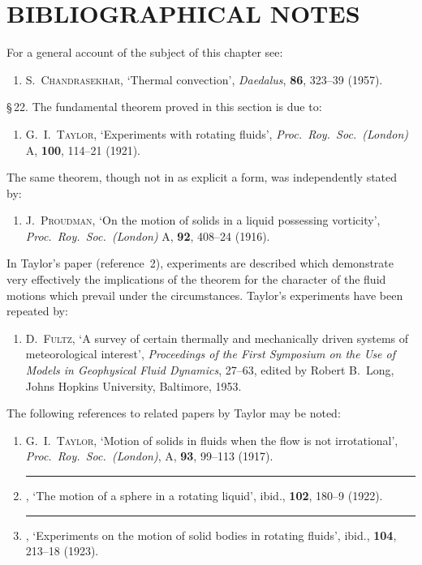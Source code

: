 \section*{BIBLIOGRAPHICAL NOTES}

For a general account of the subject of this chapter see:

\begin{enumerate}
\item[1.] S.\ \textsc{Chandrasekhar}, `Thermal convection', \emph{Daedalus}, \textbf{86}, 323--39 (1957).
\end{enumerate}

\noindent \S\,22.  The fundamental theorem proved in this section is due to:
\begin{enumerate}
\item[2.] G.\ I.\ \textsc{Taylor}, `Experiments with rotating fluids', \emph{Proc.\ Roy.\ Soc.\ (London)}
  A, \textbf{100}, 114--21 (1921).
\end{enumerate}

\noindent The same theorem, though not in as explicit a form, was independently stated by:
\begin{enumerate}
\item[3.] J.\ \textsc{Proudman}, `On the motion of solids in a liquid possessing vorticity',
  \emph{Proc.\ Roy.\ Soc.\ (London)} A, \textbf{92}, 408--24 (1916).
\end{enumerate}

In Taylor's paper (reference~2), experiments are described which demonstrate
very effectively the implications of the theorem for the character of the fluid
motions which prevail under the circumstances.  Taylor's experiments have been
repeated by:
\begin{enumerate}
\item[4.] D.\ \textsc{Fultz}, `A survey of certain thermally and mechanically driven systems
  of meteorological interest', \emph{Proceedings of the First Symposium on the Use
  of Models in Geophysical Fluid Dynamics}, 27--63, edited by Robert B.\ Long,
  Johns Hopkins University, Baltimore, 1953.
\end{enumerate}

\noindent The following references to related papers by Taylor may be noted:
\begin{enumerate}
\item[5.] G.\ I.\ \textsc{Taylor}, `Motion of solids in fluids when the flow is not irrotational',
  \emph{Proc.\ Roy.\ Soc.\ (London)}, A, \textbf{93}, 99--113 (1917).
\item[6.] \rule{2em}{0.4pt}, `The motion of a sphere in a rotating liquid', ibid., \textbf{102}, 180--9
  (1922).
\item[7.] \rule{2em}{0.4pt}, `Experiments on the motion of solid bodies in rotating fluids', ibid.,
  \textbf{104}, 213--18 (1923).
\end{enumerate}

